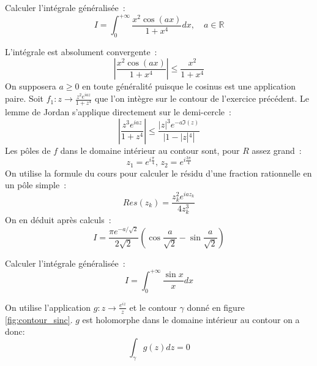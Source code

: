 \documentclass[a4paper, 12pt]{amsart}
\begin{document}
\begin{fex}
 Calculer l'intégrale généralisée~:
\[
I = \int_0^{+\infty} \frac{x^2 \cos(ax)}{1+x^4} dx , \quad a \in
\mathbb{R}
\]
\end{fex}
L'intégrale est absolument convergente~:
\[
\left |  \frac{x^2 \cos(ax)}{1+x^4} \right | \leq \frac{x^2}{1+x^4}
\]
On supposera $a\geq0$ en toute généralité puisque le cosinus est une application
paire.
Soit $f_1 : z \to \frac{z^2 e^{iaz}}{1+z^4}$ que l'on intègre sur le contour
de l'exercice précédent.
Le lemme de Jordan s'applique directement sur le demi-cercle~:
\[
\left |
\frac{z^3 e^{iaz}}{1+z^4} 
\right | \leq \frac{|z|^3 e^{-a \Im(z)}}{|1-|z|^4|}
\]
Les pôles de $f$ dans le domaine intérieur au contour sont, pour $R$ assez
grand~:
\[
z_1 = e^{i\frac{\pi}{4}}, \, z_2 = e^{i\frac{3\pi}{4}}
\]
On utilise la formule du cours pour calculer le résidu d'une fraction
rationnelle en un pôle simple~: 
\[
Res(z_k) = \frac{z_k^2 e^{ia z_k}}{4 z_k^3}
\]
On en déduit après calculs~:
\[
I = \frac{\pi e^{-a/\sqrt{2}}}{2\sqrt{2}} \left (
\cos\frac{a}{\sqrt{2}} - \sin \frac{a}{\sqrt{2}} \right )
\]

\begin{fex}
 Calculer l'intégrale généralisée~:
\[
I = \int_0^{+\infty} \frac{ \sin x}{x}dx
\]
\end{fex}
On utilise l'application $g : z \to \frac{e^{iz}}{z}$ et le contour $\gamma$ donné en
figure \ref{fig:contour_sinc}. 
$g$ est
holomorphe dans le domaine intérieur au contour on a donc:
\[
\int_{\gamma} g(z) dz = 0
\]
\end{document}
